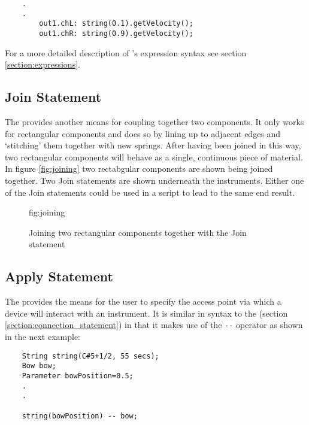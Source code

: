 \begin{verbatim}
    .
    .
        out1.chL: string(0.1).getVelocity();
        out1.chR: string(0.9).getVelocity();
\end{verbatim}

For a more detailed description of \tao's expression syntax see
section \ref{section:expressions}.

\subsection{Join Statement}
\label{section:join_statement}
The  provides another means for coupling together
two components. It only works for rectangular components and does so
by lining up to adjacent edges and `stitching' them together with new
springs. After having been joined in this way, two rectangular components
will behave as a single, continuous piece of material. In figure
\ref{fig:joining} two rectabgular components are shown being joined 
together. Two Join statements are shown underneath the instruments.
Either one of the Join statements could be used in a script to lead to
the same end result.

\begin{figure}[h]
  \begin{Label}{fig:joining}
    \begin{center}
    \end{center}
    \caption{Joining two rectangular components together with the
	Join statement}
  \end{Label}
\end{figure}

\subsection{Apply Statement}
\label{section:apply_statement}
The  provides the means for the user to specify the
access point via which a device will interact with an instrument. It is
similar in syntax to the  (section
\ref{section:connection_statement}) in that it makes use of the 
\verb|--| operator as shown in the next example:

\begin{verbatim}
    String string(C#5+1/2, 55 secs);
    Bow bow;
    Parameter bowPosition=0.5;
    .
    .
    
    string(bowPosition) -- bow;
\end{verbatim}

